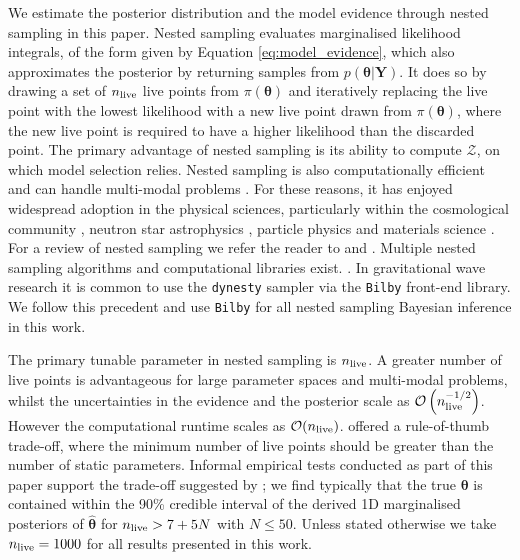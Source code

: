 \documentclass[fleqn,usenatbib,useAMS]{mnras}
\begin{document}
 We estimate the posterior distribution and the model evidence through nested sampling \citep{Skilling} in this paper. Nested sampling evaluates marginalised likelihood integrals, of the form given by Equation \eqref{eq:model_evidence}, which also approximates the posterior by returning samples from $p(\boldsymbol{\theta} | \boldsymbol{Y})$. It does so by drawing a set of $n_{\rm live}$ live points from $\pi(\boldsymbol{\theta})$ and iteratively replacing the live point with the lowest likelihood with a new live point drawn from $\pi(\boldsymbol{\theta})$, where the new live point is required to have a higher likelihood than the discarded point. The primary advantage of nested sampling is its ability to compute $\mathcal{Z}$, on which model selection relies. Nested sampling is also computationally efficient and can handle multi-modal problems \citep{Ashton2022}. For these reasons, it has enjoyed widespread adoption in the physical sciences, particularly within the cosmological community \citep{Mukherjee2006,Feroz2008,Handley2015}, neutron star astrophysics \citep{Myers2021MNRAS.502.3113M,Meyers2021,Melatos2023}, particle physics \citep{proceedings2019033014} and materials science \citep{2009arXiv0906materials}. For a review of nested sampling we refer the reader to \cite{Buchner2021} and \cite{Ashton2022}. Multiple nested sampling algorithms and computational libraries exist. \citep[e.g.][]{Feroz2008,Feroz2009,Handley2015,dynesty2020,UltraNest2021}. In gravitational wave research it is common to use the \texttt{dynesty} sampler \citep{dynesty2020} via the \texttt{Bilby} \citep{bilby.507.2037A} front-end library. We follow this precedent and use \texttt{Bilby} for all nested sampling Bayesian inference in this work. \newline 
 
The primary tunable parameter in nested sampling is $n_{\rm live}$. A greater number of live points is advantageous for large parameter spaces and multi-modal problems, whilst the uncertainties in the evidence and the posterior scale as $\mathcal{O}\left(n_{\rm live}^{-1/2}\right)$. However the computational runtime scales as $\mathcal{O}(n_{\rm live})$. \cite{Ashton2022} offered a rule-of-thumb trade-off, where the minimum number of live points should be greater than the number of static parameters. Informal empirical tests conducted as part of this paper support the trade-off suggested by \cite{Ashton2022}; we find typically that the true ${\boldsymbol{\theta}}$ is contained within the 90\% credible interval of the derived 1D marginalised posteriors of ${\boldsymbol{\hat{\theta}}}$ for $n_{\rm live} > 7 + 5N$ with $N \leq 50$. Unless stated otherwise we take $n_{\rm live} = 1000$ for all results presented in this work. \newline 
\end{document}

